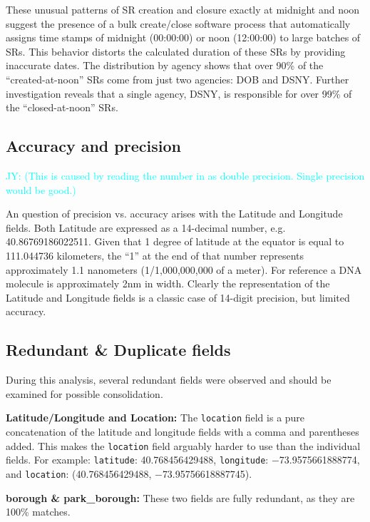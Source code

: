 \documentclass[linenumber]{jdsart}
\newcommand{\jy}[1]{\textcolor{cyan}{JY: (#1)}}
\begin{document}
These unusual patterns of SR creation and closure exactly at midnight 
and noon suggest the presence of a bulk create/close software process 
that automatically assigns time stamps of midnight (00:00:00) or noon 
(12:00:00) to large batches of SRs. This behavior distorts the 
calculated duration of these SRs by providing inaccurate dates. The 
distribution by agency shows that over 90\% of the ``created-at-noon'' 
SRs come from just two agencies: DOB and DSNY. Further investigation 
reveals that a single agency, DSNY, is responsible for over 99\% of 
the ``closed-at-noon'' SRs.



	
\subsection{Accuracy and precision}
\label{sec:precision}

\jy{This is caused by reading the number in as double
  precision. Single precision would be good.}


An question of precision vs. accuracy arises with the Latitude 
and Longitude fields. Both Latitude are expressed as 
a 14-decimal number, e.g. 40.86769186022511. Given 
that 1 degree of latitude at the equator is equal to 111.044736 
kilometers, the ``1'' at the end of that number represents 
approximately 1.1 nanometers (1/1,000,000,000 of a meter). For 
reference a DNA molecule is approximately 2nm in width. Clearly 
the representation of the Latitude and Longitude fields is a 
classic case of 14-digit precision, but limited accuracy. 



\subsection{Redundant \& Duplicate fields}
\label{sec:duplicates}

During this analysis, several redundant fields were observed and should 
be examined for possible consolidation.

\textbf{Latitude/Longitude and Location:} The \texttt{location} field 
is a pure concatenation of the latitude and longitude fields with a 
comma and parentheses added. This makes the \texttt{location} field 
arguably harder to use than the individual fields. For example:  
\texttt{latitude}: 40.768456429488, \texttt{longitude}: $-$73.9575661888774, 
and \texttt{location}: (40.768456429488, $-$73.95756618887745).

\textbf{borough \& park\_borough:} These two fields are fully redundant, 
as they are 100\% matches.
\end{document}
